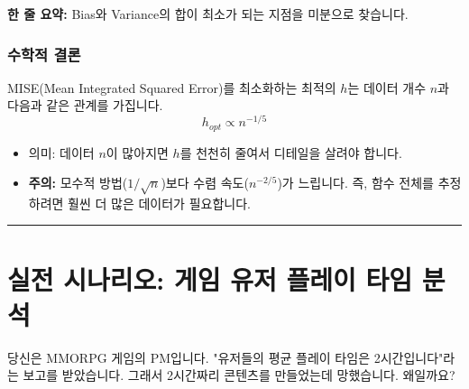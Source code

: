 \documentclass[11pt,a4paper]{book}
\theoremstyle{definition}
\begin{document}
\begin{conceptbox}[title={개념 4: 중용(Golden Mean)을 찾아서}]
\textbf{한 줄 요약:} Bias와 Variance의 합이 최소가 되는 지점을 미분으로 찾습니다.
\end{conceptbox}

\subsubsection*{수학적 결론}
MISE(Mean Integrated Squared Error)를 최소화하는 최적의 $h$는 데이터 개수 $n$과 다음과 같은 관계를 가집니다.
$$ h_{opt} \propto n^{-1/5} $$
\begin{itemize}
    \item 의미: 데이터 $n$이 많아지면 $h$를 천천히 줄여서 디테일을 살려야 합니다.
    \item \textbf{주의:} 모수적 방법($1/\sqrt{n}$)보다 수렴 속도($n^{-2/5}$)가 느립니다. 즉, 함수 전체를 추정하려면 훨씬 더 많은 데이터가 필요합니다.
\end{itemize}

\vspace{0.5cm}\hrule\vspace{0.5cm}

\section{실전 시나리오: 게임 유저 플레이 타임 분석}

\begin{storybox}[title={Scenario: 평균의 함정 탈출}]
당신은 MMORPG 게임의 PM입니다. "유저들의 평균 플레이 타임은 2시간입니다"라는 보고를 받았습니다. 그래서 2시간짜리 콘텐츠를 만들었는데 망했습니다. 왜일까요?
\end{storybox}
\end{document}

